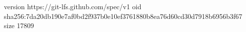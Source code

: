 version https://git-lfs.github.com/spec/v1
oid sha256:7da20db190e7af0bd2f937b0e10ef3761880b8ea76d60cd30d7918b6956b3f67
size 17809

